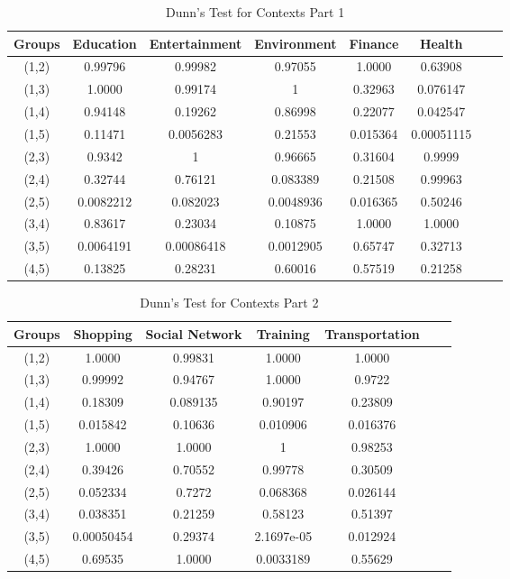 \begin{table}[h!]
  \centering
  \caption{Dunn's Test for Contexts Part 1}
  \label{tab:dunn_c}
  \begin{tabular}{cccccccc}
    \toprule
     Groups & Education & Entertainment & Environment & Finance & Health  \\
    \midrule
    (1,2)&0.99796&0.99982&0.97055&1.0000&0.63908\\
(1,3)&1.0000&0.99174&1&0.32963&0.076147\\
(1,4)&0.94148&0.19262&0.86998&0.22077&0.042547\\
(1,5)&0.11471&0.0056283&0.21553&0.015364&0.00051115\\
(2,3)&0.9342&1&0.96665&0.31604&0.9999\\
(2,4)&0.32744&0.76121&0.083389&0.21508&0.99963\\
(2,5)&0.0082212&0.082023&0.0048936&0.016365&0.50246\\
(3,4)&0.83617&0.23034&0.10875&1.0000&1.0000\\
(3,5)&0.0064191&0.00086418&0.0012905&0.65747&0.32713\\
(4,5)&0.13825&0.28231&0.60016&0.57519&0.21258\\
    \bottomrule
  \end{tabular}
\end{table}

\begin{table}[h!]
  \centering
  \caption{Dunn's Test for Contexts Part 2}
  \label{tab:dunn_c1}
  \begin{tabular}{ccccccc}
    \toprule
     Groups & Shopping & Social Network & Training & Transportation  \\
    \midrule
(1,2) &1.0000&0.99831&1.0000&1.0000\\
(1,3)&0.99992&0.94767&1.0000&0.9722\\
(1,4)&0.18309&0.089135&0.90197&0.23809\\
(1,5)&0.015842&0.10636&0.010906&0.016376\\
(2,3)&1.0000&1.0000&1&0.98253\\
(2,4)&0.39426&0.70552&0.99778&0.30509\\
(2,5)&0.052334&0.7272&0.068368&0.026144\\
(3,4)&0.038351&0.21259&0.58123&0.51397\\
(3,5)&0.00050454&0.29374&2.1697e-05&0.012924\\
(4,5)&0.69535&1.0000&0.0033189&0.55629\\
  \end{tabular}
\end{table} 


